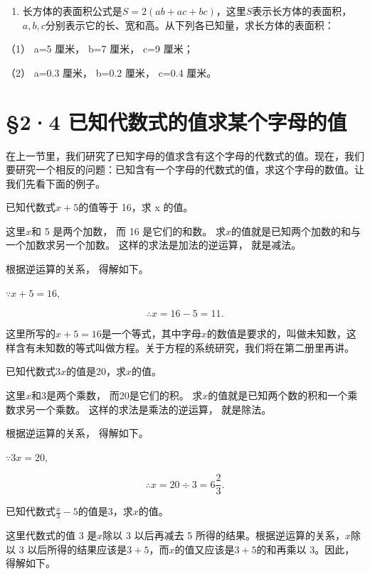 \begin{enumerate}[start=10]
\item
  长方体的表面积公式是\(S = 2(ab + ac + bc)\)，这里\(S\)表示长方体的表面积，\(a, b, c\)分别表示它的长、宽和高。从下列各已知量，求长方体的表面积：
\end{enumerate}

（1） a=5 厘米， b=7 厘米， c=9 厘米；

（2） a=0.3 厘米， b=0.2 厘米， c=0.4 厘米。

\section{§2·4 已知代数式的值求某个字母的值}

在上一节里，我们研究了已知字母的值求含有这个字母的代数式的值。现在，我们要研究一个相反的问题：已知含有一个字母的代数式的值，求这个字母的数值。让我们先看下面的例子。

 已知代数式\(x+5\)的值等于 16，求 x 的值。

 这里\(x\)和 5 是两个加数， 而 16 是它们的和数。
求\(x\)的值就是已知两个加数的和与一个加数求另一个加数。
这样的求法是加法的逆运算， 就是减法。

根据逆运算的关系， 得解如下。

\(\because x + 5 = 16,\)

\[
\therefore x = 16 - 5 = 11.
\]

这里所写的\(x + 5 = 16\)是一个等式，其中字母\(x\)的数值是要求的，叫做未知数，这样含有未知数的等式叫做方程。关于方程的系统研究，我们将在第二册里再讲。

 已知代数式\(3x\)的值是20，求\(x\)的值。

 这里\(x\)和3是两个乘数， 而20是它们的积。
求\(x\)的值就是已知两个数的积和一个乘数求另一个乘数。
这样的求法是乘法的逆运算， 就是除法。

根据逆运算的关系， 得解如下。

\(\because 3x = 20,\)

\[
\therefore x = 20 \div 3 = 6 \frac{2}{3}.
\]

 已知代数式\(\frac{x}{3} - 5\)的值是3，求\(x\)的值。

 这里代数式的值 3 是\(x\)除以 3 以后再减去 5
所得的结果。根据逆运算的关系，\(x\)除以 3
以后所得的结果应该是\(3 + 5\)，而\(x\)的值又应该是\(3 + 5\)的和再乘以
3。因此，得解如下。

